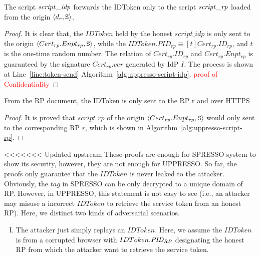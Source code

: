 \begin{theorem}
  
  \begin{lemma}\label{lemma:script-idp-to-script-rp} %
    The script $\mathit{script\_idp}$ forwards the IDToken only to 
    the script $\mathit{script\_rp}$ loaded from the origin 
    $\langle d_r, \mathtt{S}\rangle$.
  \end{lemma}
  \begin{proof}
    It is clear that, the $IDToken$ held by the honest 
    $script\_idp$ is only sent to the origin 
    $\langle Cert_{rp}.Enpt_{rp}, \mathtt{S}\rangle$, 
    while the $IDToken.PID_{rp} \equiv [t]Cert_{rp}.ID_{rp}$, 
    and $t$ is the one-time random number. The relation of 
    $Cert_{rp}.ID_{rp}$ and $Cert_{rp}.Enpt_{rp}$ is guaranteed 
    by the signature $Cert_{rp}.ver$ generated by IdP $I$. 
    The process is shown at Line~\ref{line:token-send}
    Algorithm~\ref{alg:uppresso-script-idp}.
    \textcolor{red}{proof of Confidentiality}
  \end{proof}
  
  \begin{lemma}\label{lemma:script-rp-to-rp} %
    From the RP document, the IDToken is only sent to the RP r 
    and over HTTPS
  \end{lemma}
  \begin{proof}
    It is proved that $script\_rp$ of the origin 
    $\langle Cert_{rp}.Enpt_{rp}, \mathtt{S}\rangle$ 
    would only sent to the corresponding RP $r$, 
    which is shown in Algorithm~\ref{alg:uppresso-script-rp}.
  \end{proof}
  
<<<<<<< Updated upstream
  These proofs are enough for SPRESSO system to show its 
  security, however, they are not enough for UPPRESSO. So far, 
  the proofs only guarantee that the $IDToken$ is never leaked 
  to the attacker. Obviously, the $tag$ in SPRESSO can be only 
  decrypted to a unique domain of RP. However, in UPPRESSO, this 
  statement is not easy to see (i.e., an attacker may misuse a 
  incorrect $IDToken$ to retrieve the service token from an 
  honest RP). Here, we distinct two kinds of adversarial scenarios.

  \begin{enumerate}[I.]
    \item The attacker just simply replays an $IDToken$. Here, 
      we assume the $IDToken$ is from a corrupted browser with 
      $IDToken.\mathit{PID_{RP}}$ designating the honest RP from 
      which the attacker want to retrieve the service token.


\end{enumerate}
\end{theorem}
